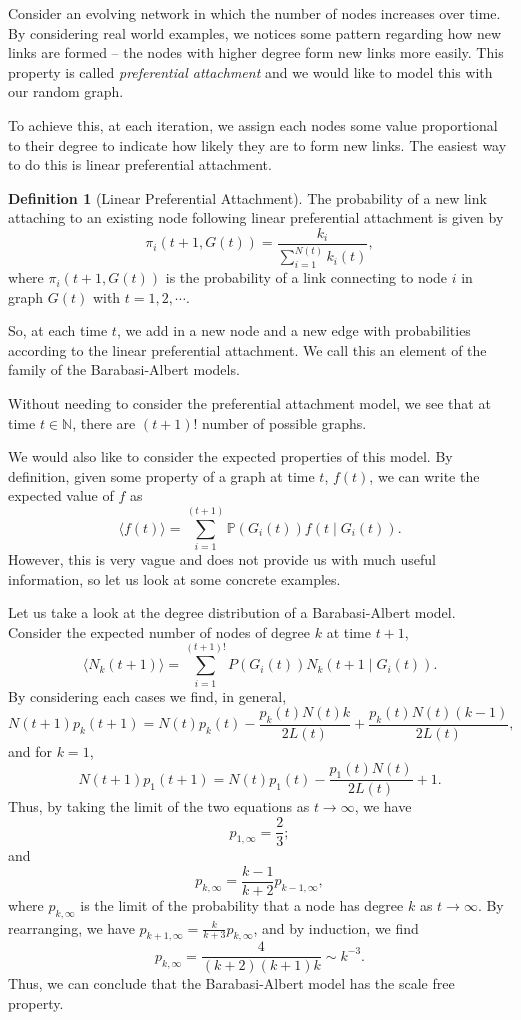 \documentclass[
]{article}
\theoremstyle{definition}
\theoremstyle{definition}
\newtheorem{definition}{Definition}[section]
\begin{document}
Consider an evolving network in which the number of nodes increases over
time. By considering real world examples, we notices some pattern
regarding how new links are formed -- the nodes with higher degree form
new links more easily. This property is called \emph{preferential
attachment} and we would like to model this with our random graph.

To achieve this, at each iteration, we assign each nodes some value
proportional to their degree to indicate how likely they are to form new
links. The easiest way to do this is linear preferential attachment.

\begin{definition}[Linear Preferential Attachment]
  The probability of a new link attaching to an existing node following 
  linear preferential attachment is given by 
  \[\pi_i (t + 1, G(t)) = \frac{k_i}{\sum_{i = 1}^{N(t)}k_i(t)},\]
  where \(\pi_i(t + 1, G(t))\) is the probability of a link connecting to node 
  \(i\) in graph \(G(t)\) with \(t = 1, 2, \cdots\).
\end{definition}

So, at each time \(t\), we add in a new node and a new edge with
probabilities according to the linear preferential attachment. We call
this an element of the family of the Barabasi-Albert models.

Without needing to consider the preferential attachment model, we see
that at time \(t \in \mathbb{N}\), there are \((t + 1)!\) number of
possible graphs.

We would also like to consider the expected properties of this model. By
definition, given some property of a graph at time \(t\), \(f(t)\), we
can write the expected value of \(f\) as
\[\langle f(t) \rangle = \sum_{i = 1}^{(t + 1)}\mathbb{P}(G_i(t))f(t \mid G_i(t)).\]
However, this is very vague and does not provide us with much useful
information, so let us look at some concrete examples.

Let us take a look at the degree distribution of a Barabasi-Albert
model. Consider the expected number of nodes of degree \(k\) at time
\(t + 1\), \[
\langle N_k(t + 1) \rangle = \sum_{i = 1}^{(t + 1)!} P(G_i(t)) N_k(t + 1 \mid G_i(t)).
\] By considering each cases we find, in general, \[
N(t + 1)p_k(t + 1) = N(t)p_k(t) - \frac{p_k(t)N(t)k}{2L(t)} + \frac{p_k(t)N(t)(k - 1)}{2L(t)},
\] and for \(k = 1\), \[
N(t + 1)p_1(t + 1) = N(t)p_1(t) - \frac{p_1(t)N(t)}{2L(t)} + 1.
\] Thus, by taking the limit of the two equations as \(t \to \infty\),
we have \[p_{1, \infty} = \frac{2}{3};\] and
\[p_{k, \infty} = \frac{k - 1}{k + 2}p_{k - 1, \infty},\] where
\(p_{k, \infty}\) is the limit of the probability that a node has degree
\(k\) as \(t \to \infty\). By rearranging, we have
\(p_{k + 1, \infty} = \frac{k}{k + 3}p_{k, \infty}\), and by induction,
we find \[p_{k, \infty} = \frac{4}{(k + 2)(k + 1)k} \sim k^{-3}.\] Thus,
we can conclude that the Barabasi-Albert model has the scale free
property.
\end{document}
